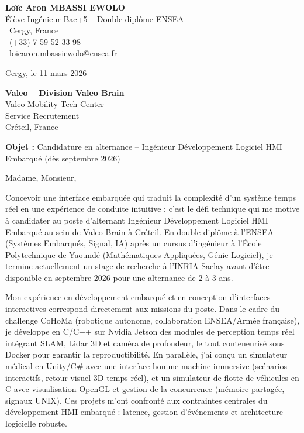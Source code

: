 \documentclass[a4paper,11pt]{article}
\begin{document}
\noindent
\begin{minipage}[t]{0.5\textwidth}
    \textbf{Loïc Aron MBASSI EWOLO}\\
    Élève-Ingénieur Bac+5 -- Double diplôme ENSEA\\[3pt]
    \Letter\ Cergy, France\\
    \Telefon\ (+33) 7 59 52 33 98\\
    \MVAt\ \href{mailto:loicaron.mbassiewolo@ensea.fr}{loicaron.mbassiewolo@ensea.fr}
\end{minipage}
\hfill
\begin{minipage}[t]{0.4\textwidth}
    \raggedleft
    Cergy, le 11 mars 2026
\end{minipage}

\vspace{1.2cm}

\hfill
\begin{minipage}[t]{0.5\textwidth}
    \raggedleft
    \textbf{Valeo -- Division Valeo Brain}\\
    Valeo Mobility Tech Center\\
    Service Recrutement\\
    Créteil, France
\end{minipage}

\vspace{1cm}

\noindent\textbf{Objet :} Candidature en alternance -- Ingénieur Développement Logiciel HMI Embarqué (dès septembre 2026)

\vspace{0.8cm}

Madame, Monsieur,

Concevoir une interface embarquée qui traduit la complexité d'un système temps réel en une expérience de conduite intuitive : c'est le défi technique qui me motive à candidater au poste d'alternant Ingénieur Développement Logiciel HMI Embarqué au sein de Valeo Brain à Créteil. En double diplôme à l'ENSEA (Systèmes Embarqués, Signal, IA) après un cursus d'ingénieur à l'École Polytechnique de Yaoundé (Mathématiques Appliquées, Génie Logiciel), je termine actuellement un stage de recherche à l'INRIA Saclay avant d'être disponible en septembre 2026 pour une alternance de 2 à 3 ans.

Mon expérience en développement embarqué et en conception d'interfaces interactives correspond directement aux missions du poste. Dans le cadre du challenge CoHoMa (robotique autonome, collaboration ENSEA/Armée française), je développe en C/C++ sur Nvidia Jetson des modules de perception temps réel intégrant SLAM, Lidar 3D et caméra de profondeur, le tout conteneurisé sous Docker pour garantir la reproductibilité. En parallèle, j'ai conçu un simulateur médical en Unity/C\# avec une interface homme-machine immersive (scénarios interactifs, retour visuel 3D temps réel), et un simulateur de flotte de véhicules en C avec visualisation OpenGL et gestion de la concurrence (mémoire partagée, signaux UNIX). Ces projets m'ont confronté aux contraintes centrales du développement HMI embarqué : latence, gestion d'événements et architecture logicielle robuste.
\end{document}

